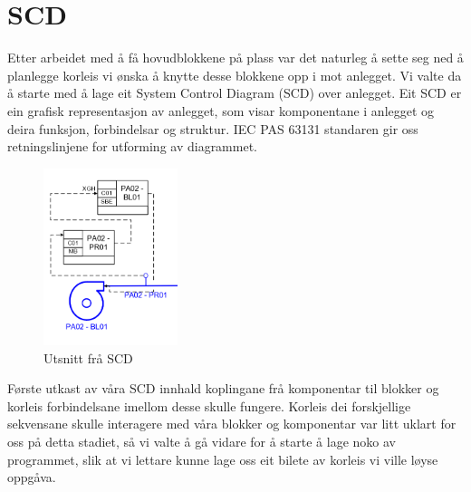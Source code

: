 \section{SCD}
\thispagestyle{fancy}

Etter arbeidet med å få hovudblokkene på plass var det naturleg å sette seg ned å planlegge korleis vi ønska å knytte desse blokkene opp i mot anlegget. 
Vi valte da å starte med å lage eit System Control Diagram (SCD) over anlegget. 
Eit SCD er ein grafisk representasjon av anlegget, som visar komponentane i anlegget og deira funksjon, forbindelsar og struktur. 
IEC PAS 63131 standaren gir oss retningslinjene for utforming av diagrammet.


\begin{figure}[htbp]
    \centering
    \includegraphics[width=0.35\textwidth]{Bilder/Visio_eksempel.png}
    \caption{Utsnitt frå SCD}\label{fig:SCD eksempel}    
\end{figure}


Første utkast av våra SCD innhald koplingane frå komponentar til blokker og korleis forbindelsane imellom desse skulle fungere. 
Korleis dei forskjellige sekvensane skulle interagere med våra blokker og komponentar var litt uklart for oss på detta stadiet, så vi valte å gå vidare for å starte å lage noko av programmet, slik at vi lettare kunne lage oss eit bilete av korleis vi ville løyse oppgåva.

\newpage